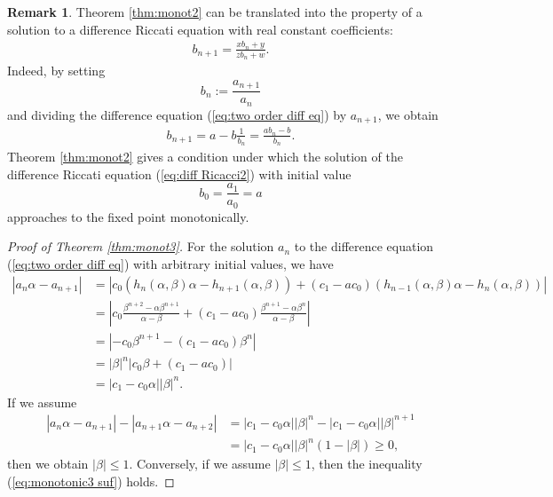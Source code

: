 \documentclass[a4paper,11pt,reqno]{amsart}
\theoremstyle{plain}
\theoremstyle{definition}
\newtheorem{rmk}[thm]{Remark}
\begin{document}
\begin{rmk}
\label{rmk:Ricacci}
Theorem \ref{thm:monot2} can be translated into the property of 
a solution to a difference Riccati equation with real constant coefficients: 
\begin{align}
\label{eq:diff Ricacci1}
b_{n+1}=\frac{xb_{n}+y}{zb_{n}+w}.
\end{align}
Indeed, by setting 
$$
b_{n}:=\frac{a_{n+1}}{a_{n}} 
$$
and dividing the difference equation (\ref{eq:two order diff eq}) by $a_{n+1}$, we obtain 
\begin{align}
\label{eq:diff Ricacci2}
b_{n+1}=a-b\frac{1}{b_{n}}=\frac{ab_{n}-b}{b_{n}} .
\end{align}
Theorem \ref{thm:monot2} gives a condition under which 
the solution of the difference Riccati equation (\ref{eq:diff Ricacci2}) 
with initial value
$$
b_{0}=\frac{a_{1}}{a_{0}}=a
$$
approaches to the fixed point monotonically.  
\end{rmk}


\begin{proof}[Proof of Theorem \ref{thm:monot3}]
For the solution $a_n$ to the difference equation (\ref{eq:two order diff eq}) with 
arbitrary initial values, we have 
\begin{align*}
\left|a_{n}\alpha -a_{n+1}\right|
   &=
   \left|c_{0}(h_{n}(\alpha ,\beta )\alpha -h_{n+1}(\alpha ,\beta ))+(c_{1}-ac_{0})(h_{n-1}(\alpha ,\beta )\alpha -h_{n}(\alpha ,\beta ))\right| \\
   &=
   \left|c_{0}\frac{\beta ^{n+2}-\alpha \beta ^{n+1}}{\alpha -\beta }
   +(c_{1}-ac_{0})\frac{\beta ^{n+1}-\alpha \beta ^{n}}{\alpha -\beta }\right| \\
   &=
   \left|-c_{0}\beta ^{n+1}
   -(c_{1}-ac_{0})\beta ^{n}\right| \\
   &=
   |\beta |^{n}
   \left|c_{0}\beta 
   +(c_{1}-ac_{0})\right| \\
   &=
   |c_{1}-c_{0}\alpha |
   |\beta |^{n}.
\end{align*}
If we assume 
\begin{align}
\left|a_{n}\alpha -a_{n+1}\right|-\left|a_{n+1}\alpha -a_{n+2}\right|
   &=
   |c_{1}-c_{0}\alpha |
   |\beta |^{n}
   -|c_{1}-c_{0}\alpha |
   |\beta |^{n+1} \nonumber \\
\label{eq:monotonic3 suf}
   &=
   |c_{1}-c_{0}\alpha |
   |\beta |^{n}   
   (1-|\beta |)\geq 0 ,
\end{align}
then we obtain $|\beta |\leq 1$. 
Conversely, if we assume $|\beta |\leq 1$, then 
the inequality (\ref{eq:monotonic3 suf}) holds. 
\end{proof}
\end{document}
